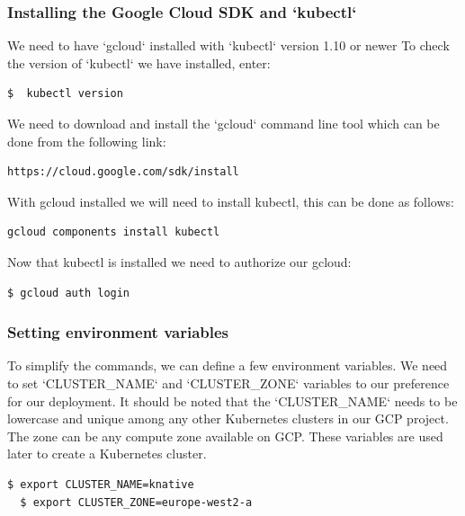 \subsubsection{Installing the Google Cloud SDK and `kubectl`}
We need to have `gcloud` installed with `kubectl` version 1.10 or newer To check the version of `kubectl` we have installed, enter:
\begin{lstlisting}[language=bash]
  $  kubectl version
\end{lstlisting}
We need to download and install the `gcloud` command line tool which can be done from the following link:
\begin{lstlisting}[language=bash]
  https://cloud.google.com/sdk/install
\end{lstlisting}
With gcloud installed we will need to install kubectl, this can be done as follows:
\begin{lstlisting}[language=bash]
  gcloud components install kubectl
\end{lstlisting}
Now that kubectl is installed we need to authorize our gcloud:
\begin{lstlisting}[language=bash]
  $ gcloud auth login
\end{lstlisting}

\subsubsection{Setting environment variables}
To simplify the commands, we can define a few environment variables. We need to set `CLUSTER\_NAME` and `CLUSTER\_ZONE` variables to our preference for our deployment. It should be noted that the `CLUSTER\_NAME` needs to be lowercase and unique among any other Kubernetes clusters in our GCP project. The zone can be any compute zone available on GCP. These variables are used later to create a Kubernetes cluster.

\begin{lstlisting}[language=bash]
  $ export CLUSTER_NAME=knative
  $ export CLUSTER_ZONE=europe-west2-a
\end{lstlisting}

